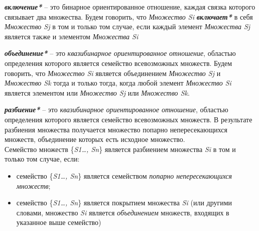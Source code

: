 \textbf{\textit{включение*}} – это бинарное ориентированное отношение, каждая связка которого связывает два множества. Будем говорить, что \textit{Множество Si} \textbf{\textit{включает*}} в себя \textit{Множество Sj} в том и только том случае, если каждый элемент \textit{Множества Sj} является также и элементом \textit{Множества Si}

\begin{SCn}
\end{SCn}
	
\textbf{\textit{объединение*}} – это \textit{квазибинарное ориентированное отношение}, областью определения которого является семейство всевозможных множеств. Будем говорить, что \textit{Множество Si} является объединением \textit{Множество Sj} и \textit{Множество Sk} тогда и только тогда, когда любой элемент \textit{Множество Si} является элементом или \textit{Множество Sj} или \textit{Множество Sk}.

\begin{SCn}
\end{SCn}
	
\textbf{\textit{разбиение*}} – это \textit{квазибинарное ориентированное отношение}, областью определения которого является семейство всевозможных множеств. В результате разбиения множества получается множество попарно непересекающихся множеств, объединение которых есть исходное множество.\\
Семейство множеств \{\textit{S1…, Sn}\} является разбиением множества \textit{Si} в том и только том случае, если:
\begin{itemize}
		\item семейство \{\textit{S1…, Sn}\} является семейством \textit{попарно непересекающихся множеств};
		\item семейство \{\textit{S1…, Sn}\} является покрытием множества \textit{Si} (или другими словами, множество \textit{Si} является \textit{объединением} множеств, входящих в указанное выше семейство)
\end{itemize}


